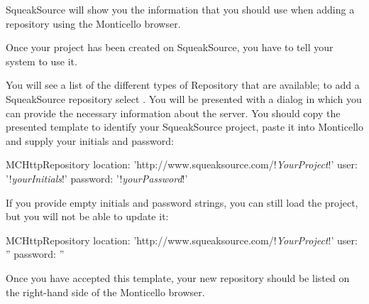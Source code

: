 \documentclass[a4paper,10pt,twoside]{book}
\begin{document}
SqueakSource will show you the information that you should use when adding a repository using the Monticello browser. 

Once your project has been created on SqueakSource, you have to tell your \squeak system to use it. 

  You will see a list of the different types of Repository that are available; to add a SqueakSource repository select . You will be presented with a dialog in which you can provide the necessary information about the server.
You should copy the presented template to identify your SqueakSource project, paste it into Monticello and supply your initials and password:

\begin{code}{}
MCHttpRepository 
    location: 'http://www.squeaksource.com/!\emph{YourProject}!'
    user: '!\emph{yourInitials}!' 
    password: '!\emph{yourPassword}!'
\end{code}   

\noindent
If you provide empty initials and password strings, you can still load the project, but you will not be able to update it:

\begin{code}{}
MCHttpRepository 
    location: 'http://www.squeaksource.com/!\emph{YourProject}!'
    user: '' 
    password: ''
\end{code}   

Once you have accepted this template, your new repository should be listed on the right-hand side of the Monticello browser.
\end{document}
